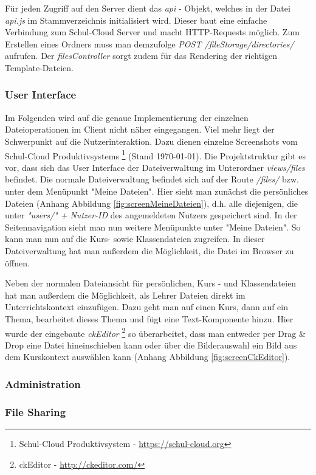 Für jeden Zugriff auf den Server dient das \textit{api} - Objekt, welches in der Datei \textit{api.js} im Stammverzeichnis initialisiert wird. Dieser baut eine einfache Verbindung zum Schul-Cloud Server und macht HTTP-Requests möglich. Zum Erstellen eines Ordners muss man demzufolge \textit{POST /fileStorage/directories/} aufrufen. Der \textit{filesController} sorgt zudem für das Rendering der richtigen Template-Dateien.

\subsubsection{User Interface}
Im Folgenden wird auf die genaue Implementierung der einzelnen Dateioperationen im Client nicht näher eingegangen. Viel mehr liegt der Schwerpunkt auf die Nutzerinteraktion. Dazu dienen einzelne Screenshots vom Schul-Cloud Produktivsystems \footnote{Schul-Cloud Produktivsystem - \url{https://schul-cloud.org}} (Stand \today). Die Projektstruktur gibt es vor, dass sich das User Interface der Dateiverwaltung im Unterordner \textit{views/files} befindet. Die normale Dateiverwaltung befindet sich auf der Route \textit{/files/} bzw. unter dem Menüpunkt "Meine Dateien". Hier sieht man zunächst die persönliches Dateien (Anhang Abbildung \ref{fig:screenMeineDateien}), d.h. alle diejenigen, die unter \textit{"users/" + Nutzer-ID} des angemeldeten Nutzers gespeichert sind. In der Seitennavigation sieht man nun weitere Menüpunkte unter "Meine Dateien". So kann man nun auf die Kurs- sowie Klassendateien zugreifen. In dieser Dateiverwaltung hat man außerdem die Möglichkeit, die Datei im Browser zu öffnen.

Neben der normalen Dateiansicht für persönlichen, Kurs - und Klassendateien hat man außerdem die Möglichkeit, als Lehrer Dateien direkt im Unterrichtskontext einzufügen. Dazu geht man auf einen Kurs, dann auf ein Thema, bearbeitet dieses Thema und fügt eine Text-Komponente hinzu. Hier wurde der eingebaute \textit{ckEditor} \footnote{ckEditor - \url{http://ckeditor.com/}} so überarbeitet, dass man entweder per Drag \& Drop eine Datei hineinschieben kann oder über die Bilderauswahl ein Bild aus dem Kurskontext auswählen kann (Anhang Abbildung \ref{fig:screenCkEditor}). 

\subsubsection{Administration}


\subsubsection{File Sharing}

\clearpage
